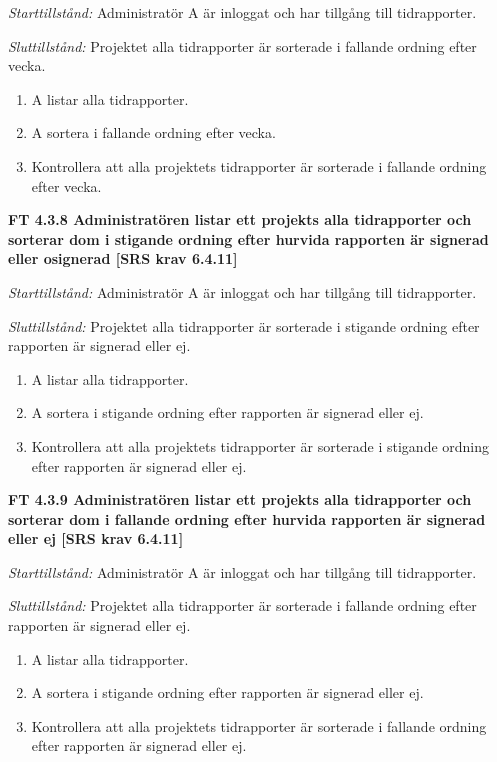 \documentclass[a4paper]{article}
\begin{document}
\emph{Starttillstånd:} Administratör A är inloggat och har tillgång till tidrapporter.

\emph{Sluttillstånd:} Projektet alla tidrapporter är sorterade i fallande ordning efter vecka.

\begin{enumerate}
\item A listar alla tidrapporter.
\item A sortera i fallande ordning efter vecka.
\item Kontrollera att alla projektets tidrapporter är sorterade i fallande ordning efter vecka.
\end{enumerate}

\textbf{FT 4.3.8 Administratören listar ett projekts alla tidrapporter och sorterar dom i stigande ordning efter hurvida rapporten är signerad eller osignerad [SRS krav 6.4.11]}

\emph{Starttillstånd:} Administratör A är inloggat och har tillgång till tidrapporter.

\emph{Sluttillstånd:} Projektet alla tidrapporter är sorterade i stigande ordning efter rapporten är signerad eller ej.

\begin{enumerate}
\item A listar alla tidrapporter.
\item A sortera i stigande ordning efter rapporten är signerad eller ej.
\item Kontrollera att alla projektets tidrapporter är sorterade i stigande ordning efter rapporten är signerad eller ej.
\end{enumerate}

\textbf{FT 4.3.9 Administratören listar ett projekts alla tidrapporter och sorterar dom i fallande ordning efter hurvida rapporten är signerad eller ej [SRS krav 6.4.11]}

\emph{Starttillstånd:} Administratör A är inloggat och har tillgång till tidrapporter.

\emph{Sluttillstånd:} Projektet alla tidrapporter är sorterade i fallande ordning efter rapporten är signerad eller ej.

\begin{enumerate}
\item A listar alla tidrapporter.
\item A sortera i stigande ordning efter rapporten är signerad eller ej.
\item Kontrollera att alla projektets tidrapporter är sorterade i fallande ordning efter rapporten är signerad eller ej.
\end{enumerate}
\end{document}
